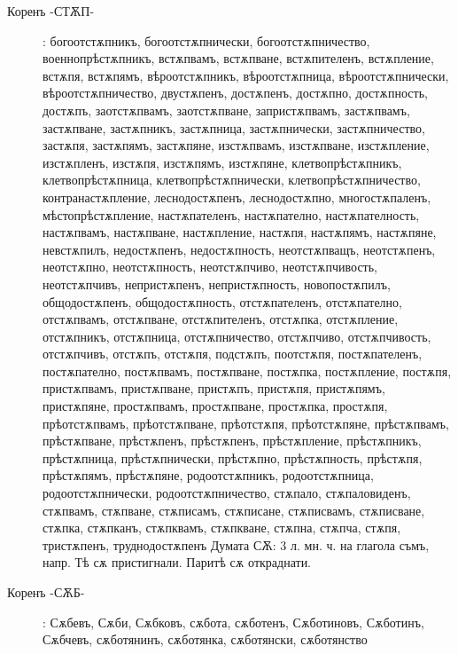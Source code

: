 \documentclass{article}
\begin{document}
\begin{description}
	\item[Коренъ -СТѪП-]: богоотстѫпникъ, богоотстѫпнически, богоотстѫпничество, военнопрѣстѫпникъ, встѫпвамъ, встѫпване, встѫпителенъ, встѫпление, встѫпя, встѫпямъ, вѣроотстѫпникъ, вѣроотстѫпница, вѣроотстѫпнически, вѣроотстѫпничество, двустѫпенъ, достѫпенъ, достѫпно, достѫпность, достѫпъ, заотстѫпвамъ, заотстѫпване, запристѫпвамъ, застѫпвамъ, застѫпване, застѫпникъ, застѫпница, застѫпнически, застѫпничество, застѫпя, застѫпямъ, застѫпяне, изстѫпвамъ, изстѫпване, изстѫпление, изстѫпленъ, изстѫпя, изстѫпямъ, изстѫпяне, клетвопрѣстѫпникъ, клетвопрѣстѫпница, клетвопрѣстѫпнически, клетвопрѣстѫпничество, контранастѫпление, леснодостѫпенъ, леснодостѫпно, многостѫпаленъ, мѣстопрѣстѫпление, настѫпателенъ, настѫпателно, настѫпателность, настѫпвамъ, настѫпване, настѫпление, настѫпя, настѫпямъ, настѫпяне, невстѫпилъ, недостѫпенъ, недостѫпность, неотстѫпващъ, неотстѫпенъ, неотстѫпно, неотстѫпность, неотстѫпчиво, неотстѫпчивость, неотстѫпчивъ, непристѫпенъ, непристѫпность, новопостѫпилъ, общодостѫпенъ, общодостѫпность, отстѫпателенъ, отстѫпателно, отстѫпвамъ, отстѫпване, отстѫпителенъ, отстѫпка, отстѫпление, отстѫпникъ, отстѫпница, отстѫпничество, отстѫпчиво, отстѫпчивость, отстѫпчивъ, отстѫпъ, отстѫпя, подстѫпъ, поотстѫпя, постѫпателенъ, постѫпателно, постѫпвамъ, постѫпване, постѫпка, постѫпление, постѫпя, пристѫпвамъ, пристѫпване, пристѫпъ, пристѫпя, пристѫпямъ, пристѫпяне, простѫпвамъ, простѫпване, простѫпка, простѫпя, прѣотстѫпвамъ, прѣотстѫпване, прѣотстѫпя, прѣотстѫпяне, прѣстѫпвамъ, прѣстѫпване, прѣстѫпенъ, прѣстѫпенъ, прѣстѫпление, прѣстѫпникъ, прѣстѫпница, прѣстѫпнически, прѣстѫпно, прѣстѫпность, прѣстѫпя, прѣстѫпямъ, прѣстѫпяне, родоотстѫпникъ, родоотстѫпница, родоотстѫпнически, родоотстѫпничество, стѫпало, стѫпаловиденъ, стѫпвамъ, стѫпване, стѫписамъ, стѫписане, стѫписвамъ, стѫписване, стѫпка, стѫпканъ, стѫпквамъ, стѫпкване, стѫпна, стѫпча, стѫпя, тристѫпенъ, труднодостѫпенъ
	Думата СѪ: 3 л. мн. ч. на глагола съмъ, напр. Тѣ сѫ пристигнали. Паритѣ сѫ откраднати.
	
	\item[Коренъ -СѪБ-]: Сѫбевъ, Сѫби, Сѫбковъ, сѫбота, сѫботенъ, Сѫботиновъ, Сѫботинъ, Сѫбчевъ, сѫботянинъ, сѫботянка, сѫботянски, сѫботянство
	

\end{description}
\end{document}
